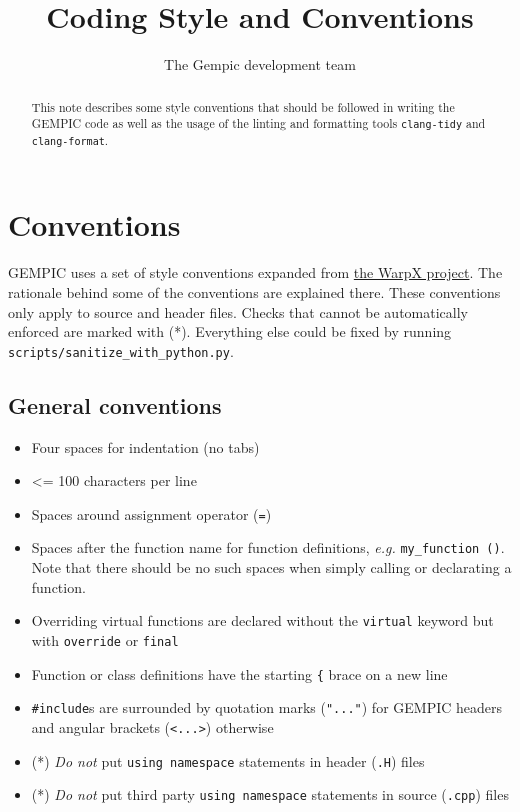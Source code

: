 \documentclass[11pt]{article}
\title{Coding Style and Conventions}
\author[1]{The Gempic development team}
\affil[1]{Max-Planck-Institut f\"ur Plasmaphysik, Garching, Germany}
\begin{document}
\maketitle

\begin{abstract}
This note describes some style conventions that should be followed in writing the GEMPIC code as well as the usage of the linting and formatting tools \verb|clang-tidy| and \verb|clang-format|.
\end{abstract}

\tableofcontents

\section{Conventions}
GEMPIC uses a set of style conventions expanded from \href{https://warpx.readthedocs.io/en/latest/developers/contributing.html#style-and-conventions}{the WarpX project}. The rationale behind some of the conventions are explained there.
These conventions only apply to source and header files. Checks that cannot be automatically enforced are marked with (*). Everything else could be fixed by running \verb|scripts/sanitize_with_python.py|.

\subsection{General conventions}
\begin{itemize}
    \item Four spaces for indentation (no tabs)
    \item <= 100 characters per line
    \item Spaces around assignment operator (\lstinline{=})
    \item Spaces after the function name for function definitions, \emph{e.g.} \lstinline{my_function ()}. Note that there should be no such spaces when simply calling or declarating a function.
    \item Overriding virtual functions are declared without the \lstinline{virtual} keyword but with \lstinline{override} or \lstinline{final}
    \item Function or class definitions have the starting \verb|{| brace on a new line
    \item \lstinline{#include}s are surrounded by quotation marks (\verb|"..."|) for GEMPIC headers and angular brackets (\verb|<...>|) otherwise
    \item (*) \emph{Do not} put \lstinline{using namespace} statements in header (\verb|.H|) files
    \item (*) \emph{Do not} put third party \lstinline{using namespace} statements in source (\verb|.cpp|) files
\end{itemize}
\end{document}
